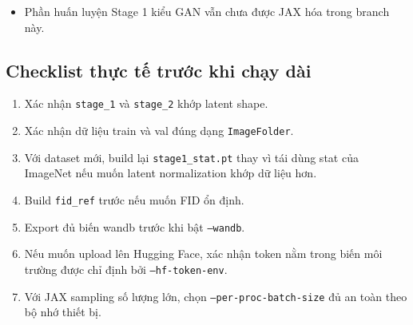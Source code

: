 \begin{itemize}[leftmargin=1.5em]
  \texttt{RAE\_JAX\_REBUILD\_BACKEND=1}, rồi tự tìm thư mục run
  \texttt{CelebA256\_SiTDH-B\_DINOv2-B\_moe1\_jax\_tpuv5e8-*} mới nhất bên dưới
  \texttt{/kaggle/working/results\_jax\_tpu/} và thư mục
  \texttt{checkpoint\_<step>/} mới nhất trong workdir đó, copy checkpoint này
  sang một workdir resume mới có timestamp, seed workdir mới bằng một
  \texttt{wandb\_run.json} mới với run id mới, rồi mới truyền
  \texttt{--workdir} vào \texttt{src\_jax/train.py}. Runtime cũng tiếp tục
  restore bằng \texttt{latest\_step()}, xóa ngay checkpoint vừa restore trong
  workdir mới sau khi state đã vào RAM, nên notebook này không còn hardcode
  \texttt{checkpoint\_100000}.
  \item Phần huấn luyện Stage 1 kiểu GAN vẫn chưa được JAX hóa trong branch này.
\end{itemize}

\subsection{Checklist thực tế trước khi chạy dài}

\begin{enumerate}[leftmargin=1.8em]
  \item Xác nhận \texttt{stage\_1} và \texttt{stage\_2} khớp latent shape.
  \item Xác nhận dữ liệu train và val đúng dạng \texttt{ImageFolder}.
  \item Với dataset mới, build lại \texttt{stage1\_stat.pt} thay vì tái dùng stat
  của ImageNet nếu muốn latent normalization khớp dữ liệu hơn.
  \item Build \texttt{fid\_ref} trước nếu muốn FID ổn định.
  \item Export đủ biến wandb trước khi bật \texttt{--wandb}.
  \item Nếu muốn upload lên Hugging Face, xác nhận token nằm trong biến môi
  trường được chỉ định bởi \texttt{--hf-token-env}.
  \item Với JAX sampling số lượng lớn, chọn \texttt{--per-proc-batch-size} đủ an
  toàn theo bộ nhớ thiết bị.
\end{enumerate}
